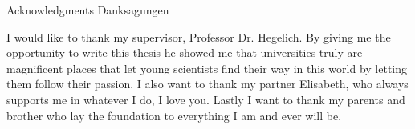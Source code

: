 \makeatletter
\makeatother
\thispagestyle{empty}

\vspace*{20mm}

\begin{center}
\makeatletter
{}
{ Acknowledgments}
{ Danksagungen}
\makeatother
\end{center}

\vspace{10mm}

I would like to thank my supervisor, Professor Dr. Hegelich. By giving me the opportunity to write this thesis he showed me that universities truly are magnificent places that let young scientists find their way in this world by letting them follow their passion. I also want to thank my partner Elisabeth, who always supports me in whatever I do, I love you. Lastly I want to thank my parents and brother who lay the foundation to everything I am and ever will be.

\cleardoublepage{}
